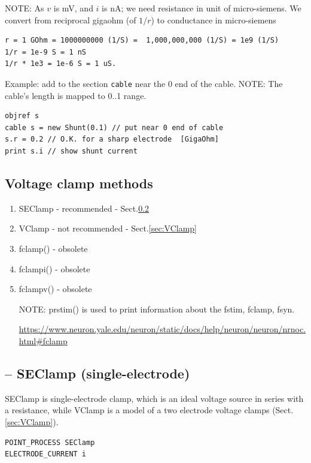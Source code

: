NOTE: As $v$ is mV, and $i$ is nA; we need resistance in unit of
micro-siemens. We convert from reciprocal gigaohm (of $1/r$) to conductance in
micro-siemens

\begin{verbatim}
r = 1 GOhm = 1000000000 (1/S) =  1,000,000,000 (1/S) = 1e9 (1/S)
1/r = 1e-9 S = 1 nS
1/r * 1e3 = 1e-6 S = 1 uS.
\end{verbatim}


Example: add to the section \verb!cable! near the 0 end of the cable. NOTE: The
cable's length is mapped to 0..1 range. 
\begin{verbatim}
objref s
cable s = new Shunt(0.1) // put near 0 end of cable
s.r = 0.2 // O.K. for a sharp electrode  [GigaOhm]
print s.i // show shunt current
\end{verbatim}


\subsection{Voltage clamp methods}

\begin{enumerate}
  \item SEClamp - recommended - Sect.\ref{sec:SEClamp}
  
  \item VClamp - not recommended - Sect.\ref{sec:VClamp}
  
  \item fclamp() - obsolete 

  \item fclampi() - obsolete
  
  \item fclampv() - obsolete

NOTE: prstim() is used to print information about the fstim, fclamp, fsyn.
  
\url{https://www.neuron.yale.edu/neuron/static/docs/help/neuron/neuron/nrnoc.html#fclamp}
\end{enumerate}


\subsection{-- SEClamp (single-electrode)}
\label{sec:SEClamp}

SEClamp is single-electrode clamp, which is an ideal  voltage source in series 
with a resistance, while VClamp is a model of a two electrode voltage clamps
(Sect.\ref{sec:VClamp}).
\begin{verbatim}
POINT_PROCESS SEClamp
ELECTRODE_CURRENT i
\end{verbatim}

